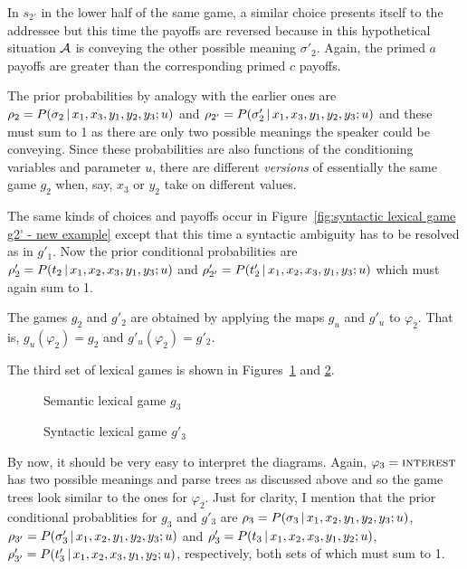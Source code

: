 In $s_{2'}$ in the lower half of the same game, a similar choice presents itself to the addressee but this time the payoffs are reversed because in this hypothetical situation $\cal A$ is conveying the other possible meaning $\sigma'_2$. Again, the primed $a$ payoffs are greater than the corresponding primed $c$ payoffs.

The prior probabilities by analogy with the earlier ones are $\rho_2 = P(\sigma_2 \,|\, x_1, x_3,\allowbreak y_1, y_2, y_3; u)$ and $\rho_{2'} = P(\sigma'_2 \,|\, x_1, x_3, y_1, y_2, y_3; u)$ and these must sum to 1 as there are only two possible meanings the speaker could be conveying. Since these probabilities are also functions of the conditioning variables and parameter $u$, there are different \emph{versions} of essentially the same game $g_2$ when, say, $x_3$ or $y_2$ take on different values.

The same kinds of choices and payoffs occur in Figure~\ref{fig:syntactic lexical game g2' - new example} except that this time a syntactic ambiguity has to be resolved as in $g'_1$. Now the prior conditional probabilities are $\rho'_2 = P(t_2 \,|\, x_1, x_2, x_3, y_1, y_3; u)$ and $\rho'_{2'} = P(t'_2 \,|\, x_1, x_2, x_3, y_1, y_3; u)$ which must again sum to 1.

The games $g_2$ and $g'_2$ are obtained by applying the maps $g_u$ and $g'_u$ to $\varphi_2$. That is, $g_u(\varphi_2) = g_2$ and $g'_u(\varphi_2) = g'_2$.

The third set of lexical games is shown in Figures~\ref{fig:semantic lexical game g3 - new example} and \ref{fig:syntactic lexical game g3' - new example}.

\begin{figure}[h] 

\caption{Semantic lexical game $g_3$}
\label{fig:semantic lexical game g3 - new example}
\end{figure}

\begin{figure}[h] 

\caption{Syntactic lexical game $g'_3$}
\label{fig:syntactic lexical game g3' - new example}
\end{figure}

By now, it should be very easy to interpret the diagrams. Again, $\varphi_3 = \Expression{interest}$ has two possible meanings and parse trees as discussed above and so the game trees look similar to the ones for $\varphi_2$. Just for clarity, I mention that the prior conditional probablities for $g_3$ and $g'_3$ are 
$\rho_3 = P(\sigma_3 \,|\, x_1, x_2, y_1, y_2, y_3; u)$, $\rho_{3'} = P(\sigma'_3 \,|\, x_1, x_2, y_1, y_2, y_3; u)$ and $\rho'_3 = P(t_3 \,|\, x_1, x_2, x_3, y_1, y_2; u)$, $\rho'_{3'} = P(t'_3 \,|\, x_1, x_2,\allowbreak x_3,\allowbreak y_1, y_2; u)$, respectively, both sets of which must sum to 1.

